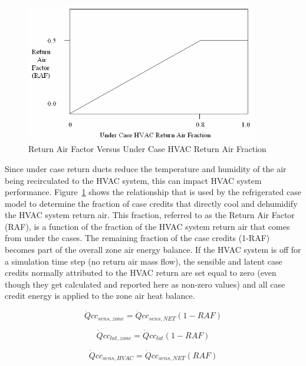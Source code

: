 \begin{figure}[hbtp] %
\centering
\includegraphics[width=0.9\textwidth, height=0.9\textheight, keepaspectratio=true]{media/image6247.png}
\caption{Return Air Factor Versus Under Case HVAC Return Air Fraction \protect \label{fig:return-air-factor-versus-under-case-hvac}}
\end{figure}

Since under case return ducts reduce the temperature and humidity of the air being recirculated to the HVAC system, this can impact HVAC system performance. Figure~\ref{fig:return-air-factor-versus-under-case-hvac} shows the relationship that is used by the refrigerated case model to determine the fraction of case credits that directly cool and dehumidify the HVAC system return air. This fraction, referred to as the Return Air Factor (RAF), is a function of the fraction of the HVAC system return air that comes from under the cases. The remaining fraction of the case credits (1-RAF) becomes part of the overall zone air energy balance. If the HVAC system is off for a simulation time step (no return air mass flow), the sensible and latent case credits normally attributed to the HVAC return are set equal to zero (even though they get calculated and reported here as non-zero values) and all case credit energy is applied to the zone air heat balance.

\begin{equation}
\dot Qc{c_{sens,zone}} = \dot Qc{c_{sens,NET}}\left( {1 - RAF} \right)
\end{equation}

\begin{equation}
\dot Qc{c_{lat,zone}} = \dot Qc{c_{lat}}\left( {1 - RAF} \right)
\end{equation}

\begin{equation}
\dot Qc{c_{sens,HVAC}} = \dot Qc{c_{sens,NET}}\left( {RAF} \right)
\end{equation}

